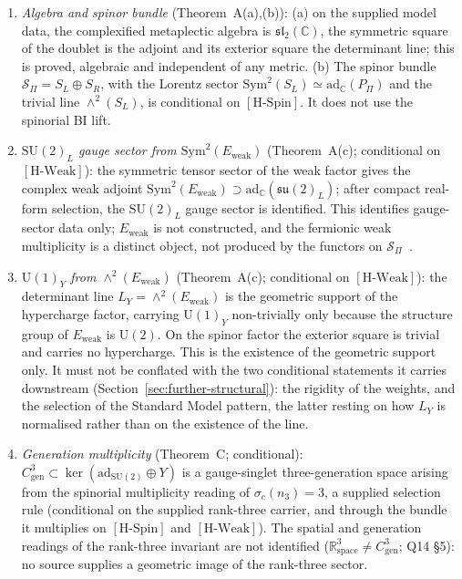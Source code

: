 \documentclass[11pt,a4paper]{article}
\theoremstyle{definition}
\newcommand{\SU}{\mathrm{SU}}
\newcommand{\su}{\mathfrak{su}}
\newcommand{\UU}{\mathrm{U}}
\newcommand{\Sbundle}{\mathcal{S}_\Pi}
\newcommand{\Cgen}{C^3_{\mathrm{gen}}}
\newcommand{\adC}{\mathrm{ad}_\mathbb{C}}
\newcommand{\Ew}{E_{\mathrm{weak}}}
\newcommand{\HSpin}{\ensuremath{[\mathrm{H\text{-}Spin}]}}
\newcommand{\HWeak}{\ensuremath{[\mathrm{H\text{-}Weak}]}}
\begin{document}
      \begin{enumerate}
        \item \textit{Algebra and spinor bundle} (Theorem~A(a),(b)):
        (a) on the supplied model data, the complexified metaplectic algebra is
        $\mathfrak{sl}_2(\mathbb{C})$, the symmetric square of the doublet is the adjoint and its exterior square the
        determinant line; this is proved, algebraic and independent of any metric.
        (b) The spinor bundle $\Sbundle = S_L \oplus S_R$, with the Lorentz sector
        $\mathrm{Sym}^2(S_L) \simeq \adC(P_\Pi)$ and the trivial line $\wedge^2(S_L)$, is conditional on \HSpin{}.
        It does not use the spinorial BI lift.

        \item \textit{$\SU(2)_L$ gauge sector from $\mathrm{Sym}^2(\Ew)$} (Theorem~A(c); conditional on \HWeak{}):
        the symmetric tensor sector of the weak factor gives the complex weak adjoint
        $\mathrm{Sym}^2(\Ew) \supset \adC(\su(2)_L)$; after compact real-form selection,
        the $\SU(2)_L$ gauge sector is identified.
        This identifies gauge-sector data only; $\Ew$ is not constructed, and the fermionic weak multiplicity is a
        distinct object, not produced by the functors on $\Sbundle$~\cite{Beau2026nsr}.

        \item \textit{$\UU(1)_Y$ from $\wedge^2(\Ew)$} (Theorem~A(c); conditional on \HWeak{}):
        the determinant line $L_Y = \wedge^2(\Ew)$ is the geometric support of the
        hypercharge factor, carrying $\UU(1)_Y$ non-trivially only because the structure group of $\Ew$ is $\UU(2)$.
        On the spinor factor the exterior square is trivial and carries no hypercharge.
        This is the existence of the geometric support only.
        It must not be conflated with the two conditional statements it carries downstream
        (Section~\ref{sec:further-structural}): the rigidity of the weights, and the selection of the
        Standard Model pattern, the latter resting on how $L_Y$ is normalised rather than on the
        existence of the line.

        \item \textit{Generation multiplicity} (Theorem~C; conditional):
        $\Cgen \subset \ker(\mathrm{ad}_{\SU(2)} \oplus Y)$ is a gauge-singlet three-generation
        space arising from the spinorial multiplicity reading of $\sigma_c(n_3) = 3$, a
        supplied selection rule (conditional on the supplied rank-three carrier, and through the bundle it multiplies
        on \HSpin{} and \HWeak{}).
        The spatial and generation readings of the rank-three invariant are not identified
        ($\mathbb{R}^3_{\mathrm{space}} \neq C^3_{\mathrm{gen}}$; Q14 \S5): no source supplies a geometric image of the
        rank-three sector.
      \end{enumerate}
\end{document}
